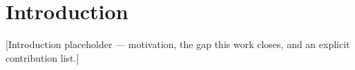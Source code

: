 \section{Introduction}
[Introduction placeholder — motivation, the gap this work closes, and an explicit contribution list.]
